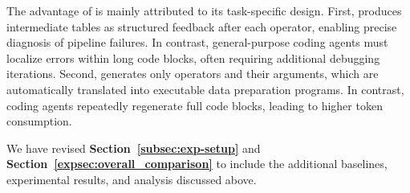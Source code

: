 
The advantage of \sys is mainly attributed to its task-specific design. First, \sys produces intermediate tables as structured feedback after each operator, enabling precise diagnosis of pipeline failures. In contrast, general-purpose coding agents must localize errors within long code blocks, often requiring additional debugging iterations. Second, \sys generates only operators and their arguments, which are automatically translated into executable data preparation programs. In contrast, coding agents repeatedly regenerate full code blocks, leading to higher token consumption.

{We have revised \textbf{Section~\ref{subsec:exp-setup}} and \textbf{Section~\ref{expsec:overall_comparison}} to include the additional baselines, experimental results, and analysis discussed above.}



